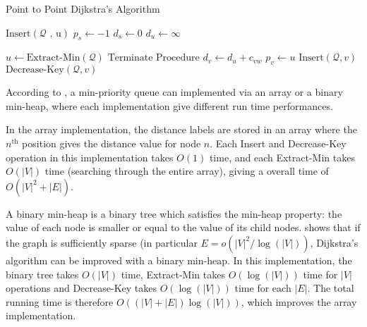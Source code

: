 \begin{algorithm}[H]
    \caption{Point to Point Dijkstra's Algorithm}
    \label{algo:p2pdijkstra}
    \begin{algorithmic}[1]
        \State $\text{Insert}(\mathcal{Q}\text{ , u})$ 
        \State $p_s \gets -1$ 
        \State $d_s \gets 0$
         
        \State $d_u \gets \infty$
    \EndFor

    \State $ u \gets \text{Extract-Min}(\mathcal{Q}) $ 
    \State $\text{Terminate Procedure}$ 
\EndIf
{}
 
\State $d_v \gets d_u + c_{vw}$
\State $p_v \gets u$
\State $\text{Insert}(\mathcal{Q}, v)$ 
\Else
\State $\text{Decrease-Key}(\mathcal{Q}, v)$ 
    \EndIf
\EndIf
                \EndFor
            \EndIf
        \EndWhile
    \EndProcedure
\end{algorithmic}
\end{algorithm}

According to \citet{Cormen},
a min-priority queue can implemented via an array or a binary min-heap, where each implementation give different run time performances.

In the array implementation,
the distance labels are stored in an array where the $n^{\text{th}}$ position gives the distance value for node $n$.
Each Insert and Decrease-Key operation in this implementation takes $O(1)$ time, and each Extract-Min takes $O(|V|)$ time (searching through the entire array), giving a overall time of $O(|V|^2 + |E|)$.

A binary min-heap is a binary tree which satisfies the min-heap property:
the value of each node is smaller or equal to the value of its child nodes.
\citet{Cormen} shows that if the graph is sufficiently sparse (in particular $E = o(|V|^2/\log(|V|))$, Dijkstra's algorithm can be improved with a binary min-heap. In this implementation, the binary tree takes $O(|V|)$ time, Extract-Min takes $O(\log(|V|))$ time for $|V|$ operations and Decrease-Key takes $O(\log(|V|))$ time for each $|E|$. The total running time is therefore $O((|V|+|E|)\log(|V|))$, which improves the array implementation.

